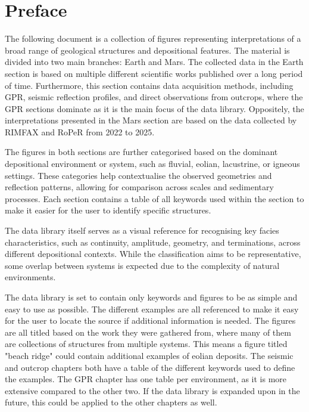 \section*{Preface}
The following document is a collection of figures representing interpretations of a broad range of geological structures and depositional features. The material is divided into two main branches: Earth and Mars. The collected data in the Earth section is based on multiple different scientific works published over a long period of time. Furthermore, this section contains data acquisition methods, including GPR, seismic reflection profiles, and direct observations from outcrops, where the GPR sections dominate as it is the main focus of the data library. Oppositely, the interpretations presented in the Mars section are based on the data collected by RIMFAX and RoPeR from 2022 to 2025. 

The figures in both sections are further categorised based on the dominant depositional environment or system, such as fluvial, eolian, lacustrine, or igneous settings. These categories help contextualise the observed geometries and reflection patterns, allowing for comparison across scales and sedimentary processes. Each section contains a table of all keywords used within the section to make it easier for the user to identify specific structures. 

The data library itself serves as a visual reference for recognising key facies characteristics, such as continuity, amplitude, geometry, and terminations, across different depositional contexts. While the classification aims to be representative, some overlap between systems is expected due to the complexity of natural environments. 

The data library is set to contain only keywords and figures to be as simple and easy to use as possible. The different examples are all referenced to make it easy for the user to locate the source if additional information is needed. The figures are all titled based on the work they were gathered from, where many of them are collections of structures from multiple systems. This means a figure titled "beach ridge" could contain additional examples of eolian deposits. The seismic and outcrop chapters both have a table of the different keywords used to define the examples. The GPR chapter has one table per environment, as it is more extensive compared to the other two. If the data library is expanded upon in the future, this could be applied to the other chapters as well. 
